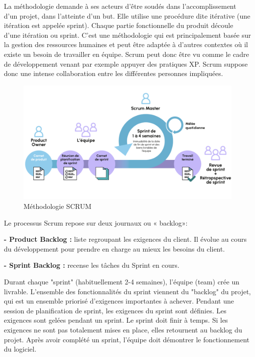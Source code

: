 \documentclass[a4paper, 12pt]{report}
\begin{document}
\begin{itemize}
La méthodologie demande à ses acteurs d'être soudés dans l'accomplissement d'un projet, dans l'atteinte d'un but. Elle utilise une procédure dite itérative (une itération est appelée sprint). Chaque partie fonctionnelle du produit découle d’une itération ou sprint. C’est une méthodologie qui est principalement basée sur la gestion des ressources humaines et peut être adaptée à d’autres contextes où il existe un besoin de travailler en équipe. Scrum peut donc être vu comme le cadre de développement venant par exemple appuyer des pratiques XP. Scrum suppose donc une intense collaboration entre les différentes personnes impliquées. 
\begin{figure}[H]
    \centering
    \includegraphics[width = 1\linewidth]{img/srum.png}
    \caption{Méthodologie SCRUM}
\end{figure}

Le processus Scrum repose sur deux journaux ou « backlog»: 

\textbf{- Product Backlog :} liste regroupant les exigences du client. Il évolue au cours du développement pour prendre  en charge au mieux les besoins du client. 

\textbf{- Sprint Backlog :} recense les tâches du Sprint en cours. 

Durant chaque "sprint" (habituellement 2-4 semaines), l'équipe (team) crée un livrable. L'ensemble des fonctionnalités du sprint viennent du "backlog" du projet, qui est un ensemble priorisé d'exigences importantes à achever. Pendant une session de planification de sprint, les exigences du sprint sont définies. Les exigences sont gelées pendant un sprint. Le sprint doit finir à temps. Si les exigences ne sont pas totalement mises en place, elles retournent au backlog du projet. Après avoir complété un sprint, l'équipe doit démontrer le fonctionnement du logiciel. 


\end{itemize}
\end{document}
